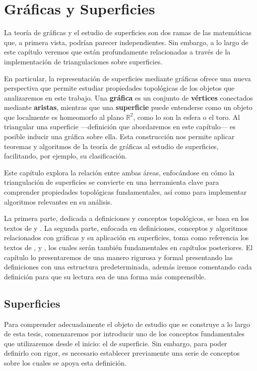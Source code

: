 \chapter{Gráficas y Superficies}
La teoría de gráficas y el estudio de superficies son dos ramas de las matemáticas que, a primera vista, podrían parecer independientes. Sin embargo, a lo largo de este capítulo veremos que están profundamente relacionadas a través de la implementación de triangulaciones sobre superficies.

En particular, la representación de superficies mediante gráficas ofrece una nueva perspectiva que permite estudiar propiedades topológicas de los objetos que analizaremos en este trabajo. Una \textbf{gráfica} es un conjunto de \textbf{vértices} conectados mediante \textbf{aristas}, mientras que una \textbf{superficie} puede entenderse como un objeto que localmente es homeomorfo al plano \(\mathbb{R}^2\), como lo son la esfera o el toro. Al triangular una superficie —definición que abordaremos en este capítulo— es posible inducir una gráfica sobre ella. Esta construcción nos permite aplicar teoremas y algoritmos de la teoría de gráficas al estudio de superficies, facilitando, por ejemplo, su clasificación.

Este capítulo explora la relación entre ambas áreas, enfocándose en cómo la triangulación de superficies se convierte en una herramienta clave para comprender propiedades topológicas fundamentales, así como para implementar algoritmos relevantes en su análisis.

La primera parte, dedicada a definiciones y conceptos topológicos, se basa en los textos de \cite{munkres_topology_2000} y \cite{prieto_topologia_2003}. La segunda parte, enfocada en definiciones, conceptos y algoritmos relacionados con gráficas y su aplicación en superficies, toma como referencia los textos de \cite{haru}, \cite{diestel} y \cite{pressley}, los cuales serán también fundamentales en capítulos posteriores.
El capítulo lo presentaremos de una manero rigurosa y formal presentando las definiciones con una estructura predeterminada, además iremos comentando cada definición para que su lectura sea de una forma más comprensible.

\section{Superficies}
Para comprender adecuadamente el objeto de estudio que se construye a lo largo de esta tesis, comenzaremos por introducir uno de los conceptos fundamentales que utilizaremos desde el inicio: el de superficie. Sin embargo, para poder definirlo con rigor, es necesario establecer previamente una serie de conceptos sobre los cuales se apoya esta definición.

